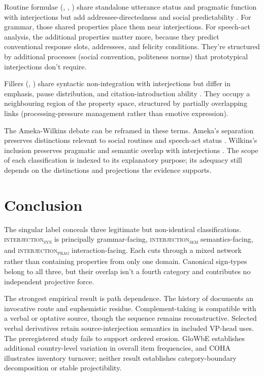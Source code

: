 \documentclass[12pt]{article}
\newcommand{\intj}[1]{\textsc{interjection\textsubscript{#1}}}
\begin{document}
Routine formulae (, , ) share
standalone utterance status and pragmatic function with interjections but
add addressee-directedness and social predictability
\citep[108--110]{ameka1992}. For grammar, those shared properties place
them near interjections. For speech-act analysis, the additional
properties matter more, because they predict conventional response slots,
addressees, and felicity conditions. They're structured by additional
processes (social convention, politeness norms) that prototypical
interjections don't require.

Fillers (, ) share syntactic non-integration with
interjections but differ in emphasis, pause distribution, and
citation-introduction ability \citep[560, 567--572]{oconnell2005}. They occupy a
neighbouring region of the property space, structured by partially
overlapping links (processing-pressure management rather than
emotive expression).

The Ameka-Wilkins debate can be reframed in these terms. Ameka's
separation preserves distinctions relevant to social routines and
speech-act status \citep[109--110]{ameka1992}. Wilkins's inclusion preserves
pragmatic and semantic overlap with interjections \citep[142]{wilkins1992}.
The scope of each classification is indexed to its explanatory purpose; its
adequacy still depends on the distinctions and projections the evidence
supports.

\section{Conclusion}\label{sec:conclusion}

The singular label  conceals three legitimate but
non-identical classifications. \intj{syn} is principally grammar-facing,
\intj{sem} semantics-facing, and \intj{prag} interaction-facing. Each cuts
through a mixed network rather than containing properties from only one
domain. Canonical sign-types belong to all three, but their overlap isn't a
fourth category and contributes no independent projective force.

The strongest empirical result is path dependence. The history of
 documents an invocative route and euphemistic residue.
Complement-taking  is compatible with a verbal or optative
source, though the sequence remains reconstructive. Selected verbal
derivatives retain source-interjection semantics in included VP-head uses.
The preregistered  study fails to support ordered erosion.
GloWbE establishes additional country-level variation in overall item
frequencies, and COHA illustrates inventory turnover; neither result
establishes category-boundary decomposition or stable projectibility.
\end{document}
